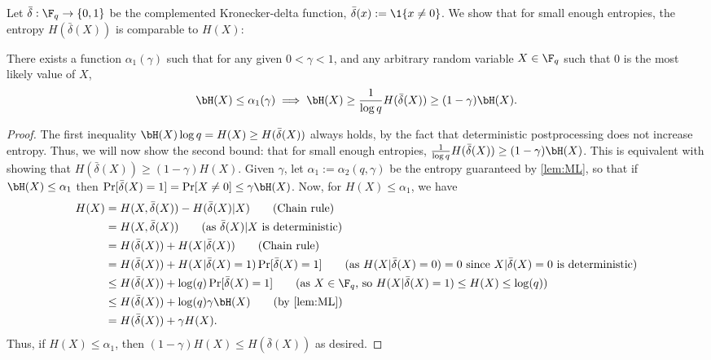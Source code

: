 \documentclass[11pt]{article}
\newcommand{\df}{\bar{\delta}}
\begin{document}
Let $\df: \F_q \to \{0, 1\}$ be the complemented Kronecker-delta function, $\df(x) := \1\{x \neq 0\}$. We show that for small enough entropies, the entropy $H(\df(X))$ is comparable to $H(X)$:
\begin{lemma}
	\label{lem:delta}
	There exists a function $\alpha_1(\gamma)$ such that
	for any given $0 < \gamma < 1$, and any arbitrary random variable $X \in \F_q$ such that $0$ is the most likely value of $X$,
	$$\bH(X) \leq \alpha_1(\gamma) \implies \bH(X) \geq \frac{1}{\log q} H(\df(X)) \geq (1-\gamma)\bH(X).$$
\end{lemma}
\begin{proof}
	The first inequality $\bH(X) \log q = H(X) \geq H(\bar\delta(X))$ always holds, by the fact that deterministic postprocessing does not increase entropy.
	Thus, we will now show the second bound: that for small enough entropies, $\frac{1}{\log q} H(\bar\delta(X)) \geq (1-\gamma)\bH(X)$. This is equivalent with showing that $H(\df(X)) \geq (1 - \gamma)H(X)$.
	Given $\gamma$, let $\alpha_1 := \alpha_2(q,\gamma)$ be the entropy guaranteed by \cref{lem:ML}, so that
	if $\bH(X) \leq \alpha_1$ then $\Pr[\bar\delta(X)=1]=\Pr[X \neq 0] \leq \gamma \bH(X)$.
	Now, for $H(X) \leq \alpha_1$, we have 
	\begin{align*}
		H(X) &= H(X, \df(X)) - H(\df(X)|X) \tag{Chain rule}\\
		&= H(X, \df(X)) \tag{as $\df(X)|X$ is deterministic}\\
		&= H(\df(X)) + H(X | \df(X)) \tag{Chain rule}\\
		&= H(\df(X))  + H(X | \df(X) = 1)\Pr[\df(X) = 1] \tag{as $H(X|\df(X)=0) = 0$ since $X|\df(X)=0$ is deterministic}\\
		&\leq H(\df(X))  + \log(q)\Pr[\df(X) = 1] \tag{as $X \in \F_q$, so $H(X | \df(X) = 1)\le H(X) \leq \log(q)$}\\
		&\leq H(\df(X))  + \log(q) \gamma \bH(X) \tag{by \cref{lem:ML}} \\
		&= H(\df(X)) + \gamma H(X).
	\end{align*}
	Thus, if $H(X) \leq \alpha_1$, then
	$(1-\gamma)H(X) \leq H(\bar\delta(X))$ as desired.
\end{proof}
\end{document}
